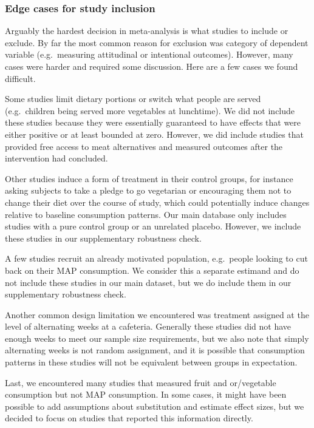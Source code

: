 \documentclass[sn-nature,pdflatex]{sn-jnl}
\begin{document}
\subsubsection{Edge cases for study
inclusion}\label{edge-cases-for-study-inclusion}

Arguably the hardest decision in meta-analysis is what studies to
include or exclude. By far the most common reason for exclusion was
category of dependent variable (e.g.~measuring attitudinal or
intentional outcomes). However, many cases were harder and required some
discussion. Here are a few cases we found difficult.

Some studies limit dietary portions or switch what people are served
(e.g.~children being served more vegetables at lunchtime). We did not
include these studies because they were essentially guaranteed to have
effects that were either positive or at least bounded at zero. However,
we did include studies that provided free access to meat alternatives
\citep{acharya2004, bianchi2022} and measured outcomes after the
intervention had concluded.

Other studies induce a form of treatment in their control groups, for
instance asking subjects to take a pledge to go vegetarian or
encouraging them not to change their diet over the course of study,
which could potentially induce changes relative to baseline consumption
patterns. Our main database only includes studies with a pure control
group or an unrelated placebo. However, we include these studies in our
supplementary robustness check.

A few studies recruit an already motivated population, e.g.~people
looking to cut back on their MAP consumption. We consider this a
separate estimand and do not include these studies in our main dataset,
but we do include them in our supplementary robustness check.

Another common design limitation we encountered was treatment assigned
at the level of alternating weeks at a cafeteria. Generally these
studies did not have enough weeks to meet our sample size requirements,
but we also note that simply alternating weeks is not random assignment,
and it is possible that consumption patterns in these studies will not
be equivalent between groups in expectation.

Last, we encountered many studies that measured fruit and or/vegetable
consumption but not MAP consumption. In some cases, it might have been
possible to add assumptions about substitution and estimate effect
sizes, but we decided to focus on studies that reported this information
directly.
\end{document}
